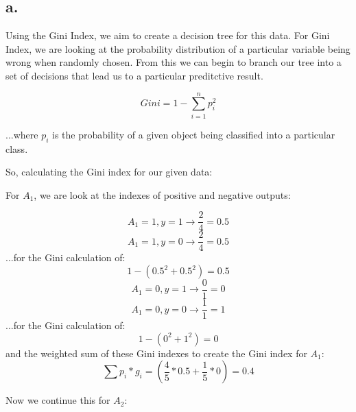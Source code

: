 \documentclass{article}
\begin{document}
\subsection*{a.}

Using the Gini Index, we aim to create a decision tree for this data. For Gini Index, we are looking at the probability distribution of a particular variable being wrong when randomly chosen. From this we can begin to branch our tree into a set of decisions that lead us to a particular preditctive result.

\begin{equation}
    Gini = 1-\sum^{n}_{i=1} p_i^2
\end{equation}

\noindent ...where $p_i$ is the probability of a given object being classified into a particular class.

So, calculating the Gini index for our given data:

\noindent For $A_1$, we are look at the indexes of positive and negative outputs:

\begin{equation}
    {A_1=1,y=1} \rightarrow \frac{2}{4} = 0.5
\end{equation}
\begin{equation}
    {A_1=1,y=0} \rightarrow \frac{2}{4} = 0.5
\end{equation}
\noindent ...for the Gini calculation of:
\begin{equation}
    1-(0.5^2 + 0.5^2) = 0.5
\end{equation}
\begin{equation}
    {A_1=0,y=1} \rightarrow \frac{0}{1} = 0
\end{equation}
\begin{equation}
    {A_1=0,y=0} \rightarrow \frac{1}{1} = 1
\end{equation}
\noindent ...for the Gini calculation of:
\begin{equation}
    1-(0^2 + 1^2) = 0
\end{equation}
\noindent and the weighted sum of these Gini indexes to create the Gini index for $A_1$:
\begin{equation}
    \sum p_i * g_i = (\frac{4}{5}*0.5 + \frac{1}{5}*0) = 0.4
\end{equation}

\noindent Now we continue this for $A_2$:
\end{document}
